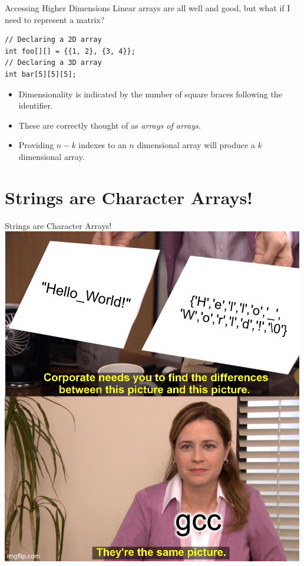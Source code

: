 \documentclass[11pt]{beamer}
\begin{document}
\begin{frame}[fragile=singleslide]{Accessing Higher Dimensions}
Linear arrays are all well and good, but what if I need to represent a matrix? 
\begin{lstlisting}[style=C]
// Declaring a 2D array
int foo[][] = {{1, 2}, {3, 4}};
// Declaring a 3D array
int bar[5][5][5];
\end{lstlisting}
\begin{itemize}
\item Dimensionality is indicated by the number of square braces following the identifier.
\item These are correctly thought of as \emph{arrays of arrays}.
\item Providing $n-k$ indexes to an $n$ dimensional array will produce a $k$ dimensional array.
\end{itemize}
\end{frame}

\section[String]{Strings are Character Arrays!} 
\begin{frame}{Strings are Character Arrays!}
\center
\includegraphics[scale=0.3]{charArrays.jpg}
\end{frame}
\end{document}
